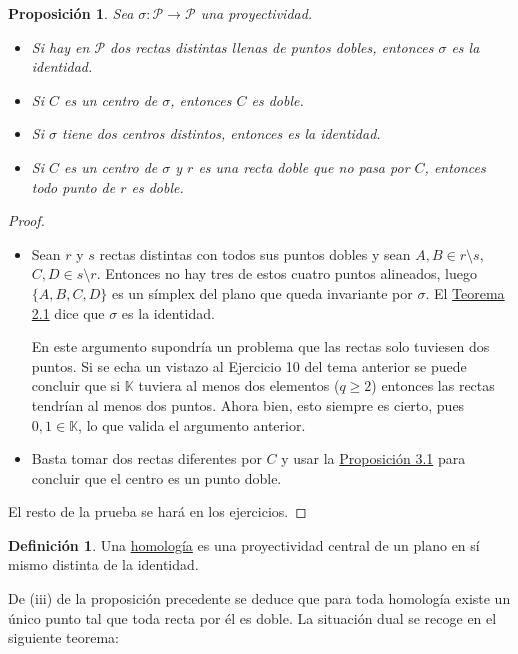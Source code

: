 \documentclass[12pt]{report}
\newtheorem{proposition}{Proposición}[chapter]
\theoremstyle{definition}
\newtheorem{definition}{Definición}[chapter]
\theoremstyle{definition}
\theoremstyle{remark}
\begin{document}
\begin{proposition}
\label{prop3.2.}
Sea $\sigma \colon \mathcal{P} \to \mathcal{P}$ una proyectividad.
\begin{itemize}
    \item[(i)] Si hay en $\mathcal{P}$ dos rectas distintas llenas de puntos dobles, entonces $\sigma$ es la identidad.
    \item[(ii)] Si $C$ es un centro de $\sigma$, entonces $C$ es doble.
    \item[(iii)] Si $\sigma$ tiene dos centros distintos, entonces es la identidad.
    \item[(iv)] Si $C$ es un centro de $\sigma$ y $r$ es una recta doble que no pasa por $C$, entonces todo punto de $r$ es doble.
\end{itemize}
\end{proposition}

\begin{proof}
\hfill
\begin{itemize}
    \item[(i)] Sean $r$ y $s$ rectas distintas con todos sus puntos dobles y sean $A,B \in r \setminus s$, $C,D \in s \setminus r$. Entonces no hay tres de estos cuatro puntos alineados, luego $\{A,B,C,D\}$ es un símplex del plano que queda invariante por $\sigma$. El \hyperref[teo2.1.]{\color{blue}Teorema 2.1} dice que $\sigma$ es la identidad.

    \vspace{2mm}
    En este argumento supondría un problema que las rectas solo tuviesen dos puntos. Si se echa un vistazo al Ejercicio 10 del tema anterior se puede concluir que si $\mathbb{K}$ tuviera al menos dos elementos ($q \geq 2$) entonces las rectas tendrían al menos dos puntos. Ahora bien, esto siempre es cierto, pues $0, 1 \in \mathbb{K}$, lo que valida el argumento anterior.
    
    \item[(ii)] Basta tomar dos rectas diferentes por $C$ y usar la \hyperref[prop3.1.]{\color{blue}Proposición 3.1} para concluir que el centro es un punto doble.
\end{itemize}
El resto de la prueba se hará en los ejercicios.
\end{proof}

\begin{definition}
Una \ul{homología} es una proyectividad central de un plano en sí mismo distinta de la identidad.
\end{definition}

De (iii) de la proposición precedente se deduce que para toda homología existe un único punto tal que toda recta por él es doble. La situación dual se recoge en el siguiente teorema:
\end{document}
